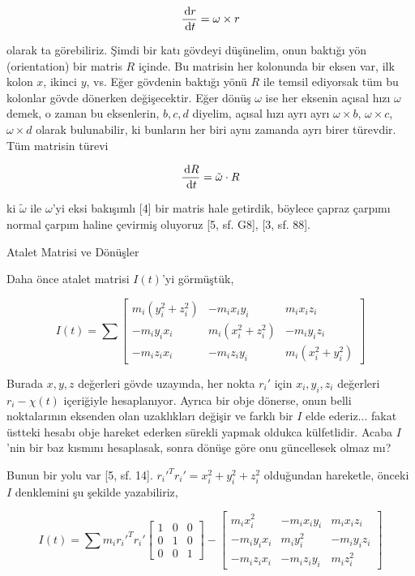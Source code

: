 \documentclass[12pt,fleqn]{article}\usepackage{../../common}
\begin{document}
$$
\frac{\,\mathrm{d} r}{\,\mathrm{d} t} = \omega \times r
$$

olarak ta görebiliriz. Şimdi bir katı gövdeyi düşünelim, onun baktığı yön
(orientation) bir matris $R$ içinde. Bu matrisin her kolonunda bir eksen var,
ilk kolon $x$, ikinci $y$, vs. Eğer gövdenin baktığı yönü $R$ ile temsil
ediyorsak tüm bu kolonlar gövde dönerken değişecektir. Eğer dönüş $\omega$ ise
her eksenin açısal hızı $\omega$ demek, o zaman bu eksenlerin, $b,c,d$ diyelim,
açısal hızı ayrı ayrı $\omega \times b$, $\omega \times c$, $\omega \times d$
olarak bulunabilir, ki bunların her biri aynı zamanda ayrı birer türevdir. Tüm
matrisin türevi

$$
\frac{\,\mathrm{d} R}{\,\mathrm{d} t} = \tilde \omega \cdot R
$$

ki $\tilde \omega$ ile $\omega$'yi eksi bakışımlı [4] bir matris hale getirdik,
böylece çapraz çarpımı normal çarpım haline çevirmiş oluyoruz [5, sf. G8],
[3, sf. 88].

Atalet Matrisi ve Dönüşler

Daha önce atalet matrisi $I(t)$'yi görmüştük,

$$
I(t) = \sum \left[\begin{array}{ccc}
m_i (y_i^2 + z_i^2) & -m_i x_i y_i & m_i x_i z_i \\
-m_i y_i x_i & m_i (x_i^2 + z_i^2) & -m_i y_i z_i \\
-m_i z_i x_i & -m_i z_i y_i & m_i (x_i^2 + y_i^2)
\end{array}\right]
$$

Burada $x,y,z$ değerleri gövde uzayında, her nokta $r_i'$ için $x_i,y_i,z_i$
değerleri $r_i - \chi(t)$ içeriğiyle hesaplanıyor. Ayrıca bir obje dönerse, onun
belli noktalarının eksenden olan uzaklıkları değişir ve farklı bir $I$ elde
ederiz... fakat üstteki hesabı obje hareket ederken sürekli yapmak oldukca
külfetlidir. Acaba $I$'nin bir baz kısmını hesaplasak, sonra dönüşe göre onu
güncellesek olmaz mı?

Bunun bir yolu var [5, sf. 14]. $r_i'^T r_i' = x_i^2 + y_i^2 + z_i^2$ olduğundan
hareketle, önceki $I$ denklemini şu şekilde yazabiliriz,

$$
I(t) = \sum
m_i r_i'^T r_i' \left[\begin{array}{ccc}
1 & 0 & 0 \\ 
0 & 1 & 0 \\ 
0 & 0 & 1 
\end{array}\right] -
\left[\begin{array}{ccc}
m_i x_i^2 & -m_i x_i y_i & m_i x_i z_i \\
-m_i y_i x_i & m_i y_i^2 & -m_i y_i z_i \\
-m_i z_i x_i & -m_i z_i y_i & m_i z_i^2
\end{array}\right]
$$
\end{document}
